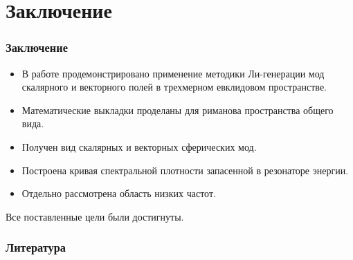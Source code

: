 \documentclass[compress]{beamer}
\begin{document}

    \section{Заключение}


    \begin{frame}\frametitle{Заключение}

        \begin{itemize}\justifying
            \item В работе продемонстрировано применение методики Ли-генерации мод скалярного и векторного полей в трехмерном евклидовом пространстве.

            \item Математические выкладки проделаны для риманова пространства общего вида.

            \item Получен вид скалярных и векторных сферических мод.

            \item Построена кривая спектральной плотности запасенной в резонаторе энергии.

            \item Отдельно рассмотрена область низких частот.
        \end{itemize}

        Все поставленные цели были достигнуты.

    \end{frame}


    \begin{frame}\frametitle{Литература}
        \nocite{burlankov_tmf,methods_of_theoretical_physics}
        
        
    \end{frame}
\end{document}
